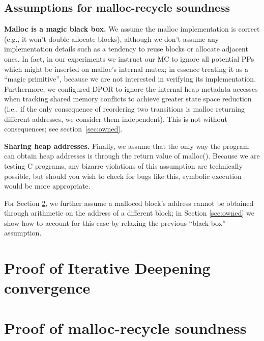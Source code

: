 \documentclass[pldi]{sigplanconf-pldi15}
\begin{document}
\subsection{Assumptions for malloc-recycle soundness}

{\bf Malloc is a magic black box.}
We assume the malloc implementation is correct (e.g., it won't double-allocate blocks), although we don't assume any implementation details such as a tendency to reuse blocks or allocate adjacent ones.
In fact, in our experiments we instruct our MC to ignore all potential PPs which might be inserted on malloc's internal mutex;
in essence treating it as a ``magic primitive'', because we are not interested in verifying its implementation.
Furthermore, we configured DPOR to ignore the internal heap metadata accesses
when tracking shared memory conflicts to achieve greater state space reduction
(i.e., if the only consequence of reordering two transitions is malloc returning different addresses, we consider them independent).
This is not without consequences; see section~\ref{sec:owned}.

{\bf Sharing heap addresses.}
Finally, we assume that the only way the program can obtain heap addresses is through the return value of malloc().
Because we are testing C programs, any bizarre violations of this assumption are technically possible,
but should you wish to check for bugs like this,
symbolic execution \cite{klee} would be more appropriate.

For Section \ref{sec:proof}, we further assume a malloced block's address cannot be obtained through arithmetic on the address of a different block; in Section \ref{sec:owned} we show how to account for this case by relaxing the previous ``black box'' assumption.


\section{Proof of Iterative Deepening convergence}



\section{Proof of malloc-recycle soundness}
\label{sec:proof}
\end{document}
